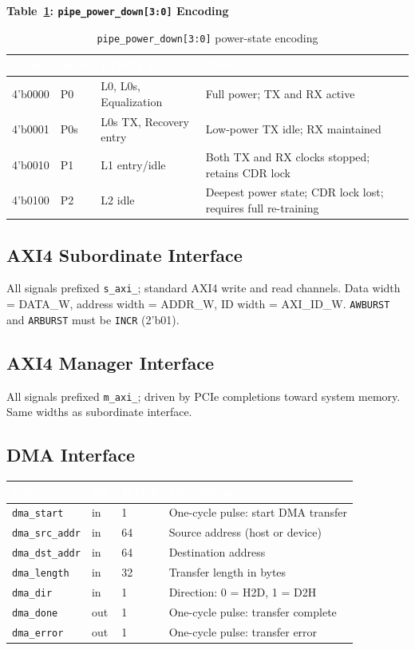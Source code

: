 \documentclass[11pt,a4paper]{article}
\newcommand{\theadcell}[1]{%
  \cellcolor{tablehead}\textcolor{white}{\textbf{#1}}}
\begin{document}
\noindent\textbf{Table~\ref{tab:powerdown}: \texttt{pipe\_power\_down[3:0]} Encoding}
\begin{table}[h!]
\label{tab:powerdown}
\centering
\begin{tabular}{lllp{7cm}}
  \toprule
  \theadcell{Code} & \theadcell{State} & \theadcell{LTSSM Use} & \theadcell{Description} \\
  \midrule
  4'b0000 & P0   & L0, L0s, Equalization & Full power; TX and RX active \\
  4'b0001 & P0s  & L0s TX, Recovery entry & Low-power TX idle; RX maintained \\
  4'b0010 & P1   & L1 entry/idle & Both TX and RX clocks stopped; retains CDR lock \\
  4'b0100 & P2   & L2 idle        & Deepest power state; CDR lock lost; requires full re-training \\
  \bottomrule
\end{tabular}
\caption{\texttt{pipe\_power\_down[3:0]} power-state encoding}
\end{table}

\subsection{AXI4 Subordinate Interface}

All signals prefixed \texttt{s\_axi\_}; standard AXI4 write and read channels.
Data width = DATA\_W, address width = ADDR\_W, ID width = AXI\_ID\_W.
\texttt{AWBURST} and \texttt{ARBURST} must be \texttt{INCR} (2'b01).

\subsection{AXI4 Manager Interface}

All signals prefixed \texttt{m\_axi\_}; driven by PCIe completions toward system memory.
Same widths as subordinate interface.

\subsection{DMA Interface}

\begin{tabular}{lllp{7.5cm}}
  \toprule
  \theadcell{Port} & \theadcell{Dir} & \theadcell{Width} & \theadcell{Description} \\
  \midrule
  \texttt{dma\_start}    & in  & 1  & One-cycle pulse: start DMA transfer \\
  \texttt{dma\_src\_addr}& in  & 64 & Source address (host or device) \\
  \texttt{dma\_dst\_addr}& in  & 64 & Destination address \\
  \texttt{dma\_length}   & in  & 32 & Transfer length in bytes \\
  \texttt{dma\_dir}      & in  & 1  & Direction: 0 = H2D, 1 = D2H \\
  \texttt{dma\_done}     & out & 1  & One-cycle pulse: transfer complete \\
  \texttt{dma\_error}    & out & 1  & One-cycle pulse: transfer error \\
  \bottomrule
\end{tabular}
\end{document}
